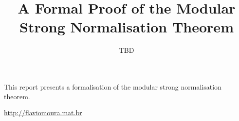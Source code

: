 \documentclass[12pt]{llncs}
\title{A Formal Proof of the Modular Strong Normalisation Theorem}
\author{TBD}
\begin{document}
\maketitle

This report presents a formalisation of the modular strong normalisation theorem.

\begin{center} \url{http://flaviomoura.mat.br} \end{center}

\thispagestyle{empty}
\mbox{}\vfill




\clearpage



\end{document}
